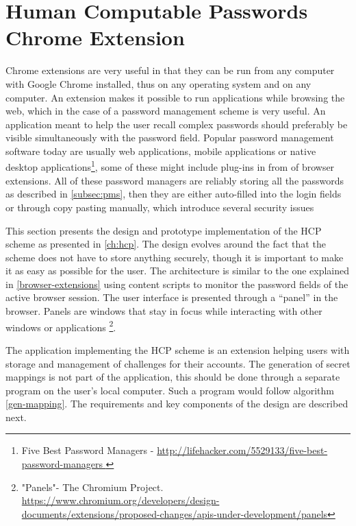 \section{Human Computable Passwords Chrome Extension}
Chrome extensions are very useful in that they can be run from any computer with Google Chrome installed, thus on any operating system and on any computer. An extension makes it possible to run applications while browsing the web, which in the case of a password management scheme is very useful. An application meant to help the user recall complex passwords should preferably be visible simultaneously with the password field. Popular password management software today are usually web applications, mobile applications or native desktop applications\footnote{Five Best Password Managers - \url{ http://lifehacker.com/5529133/five-best-password-managers }}, some of these might include plug-ins in from of browser extensions. All of these password managers are reliably storing all the passwords as described in \autoref{subsec:pms}, then they are either auto-filled into the login fields or through copy pasting manually, which introduce several security issues\cite{protecting-browsers, javascript-injection, chrome-extension-dangers, carlini-chrome, liu-chrome, pw-managment-attacks}
\par This section presents the design and prototype implementation of the HCP scheme as presented in \autoref{ch:hcp}. The design evolves around the fact that the scheme does not have to store anything securely, though it is important to make it as easy as possible for the user. The architecture is similar to the one explained in \autoref{browser-extensions} using content scripts to monitor the password fields of the active browser session. The user interface is presented through a ``panel'' in the browser. Panels are windows that stay in focus while interacting with other windows or applications \footnote{"Panels"- The Chromium Project. \url{https://www.chromium.org/developers/design-documents/extensions/proposed-changes/apis-under-development/panels}}.


The application implementing the HCP scheme is an extension helping users with storage and management of challenges for their accounts. The generation of secret mappings is not part of the application, this should be done through a separate program on the user's local computer. Such a program would follow algorithm \ref{gen-mapping}. The requirements and key components of the design are described next.




